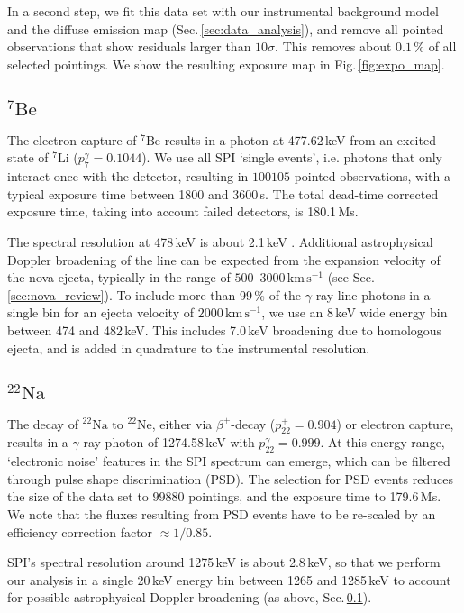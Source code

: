 \documentclass{aa}
\newcommand{\mrm}[1]{\mathrm{#1}}
\newcommand{\nuc}[2]{$\mrm{^{#2}#1}$}
\begin{document}
In a second step, we fit this data set with our instrumental background model and the diffuse emission map (Sec.\,\ref{sec:data_analysis}), and remove all pointed observations that show residuals larger than $10\sigma$.
%
This removes about $0.1\,\%$ of all selected pointings.
%
We show the resulting exposure map in Fig.\,\ref{fig:expo_map}.
%

\subsection{\nuc{Be}{7}}\label{sec:be7_data_set}
%
The electron capture of \nuc{Be}{7} results in a photon at 477.62\,keV from an excited state of \nuc{Li}{7} ($p_7^{\gamma} = 0.1044$).
%
We use all SPI `single events', i.e. photons that only interact once with the detector, resulting in $100105$ pointed observations, with a typical exposure time between 1800 and 3600\,s.
%
The total dead-time corrected exposure time, taking into account failed detectors, is 180.1\,Ms.

The spectral resolution at 478\,keV is about 2.1\,keV \citep{Diehl2018_BGRDB}.
%
Additional astrophysical Doppler broadening of the line can be expected from the expansion velocity of the nova ejecta, typically in the range of $500$--$3000\,\mrm{km\,s^{-1}}$ (see Sec.\,\ref{sec:nova_review}).
%
To include more than 99\,\% of the $\gamma$-ray line photons in a single bin for an ejecta velocity of $2000\,\mrm{km\,s^{-1}}$, we use an 8\,keV wide energy bin between 474 and 482\,keV.
%
This includes 7.0\,keV broadening due to homologous ejecta, and is added in quadrature to the instrumental resolution.

\subsection{\nuc{Na}{22}}\label{sec:na22_data_set}
%
The decay of \nuc{Na}{22} to \nuc{Ne}{22}, either via $\beta^+$-decay ($p_{22}^+ = 0.904$) or electron capture, results in a $\gamma$-ray photon of 1274.58\,keV with $p_{22}^{\gamma} = 0.999$.
%
At this energy range, `electronic noise' features in the SPI spectrum can emerge, which can be filtered through pulse shape discrimination (PSD).
%
The selection for PSD events reduces the size of the data set to $99880$ pointings, and the exposure time to 179.6\,Ms.
%
We note that the fluxes resulting from PSD events have to be re-scaled by an efficiency correction factor $\approx 1/0.85$.

SPI's spectral resolution around 1275\,keV is about 2.8\,keV, so that we perform our analysis in a single 20\,keV energy bin between 1265 and 1285\,keV to account for possible astrophysical Doppler broadening (as above, Sec.\,\ref{sec:be7_data_set}).
\end{document}
